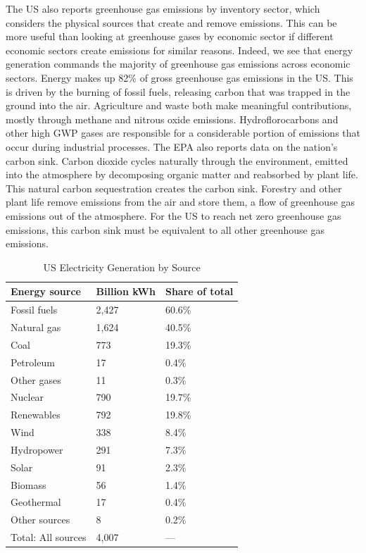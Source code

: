 The US also reports greenhouse gas emissions by inventory sector, which considers the physical sources that create and remove emissions. This can be more useful than looking at  greenhouse gases by economic sector if different economic sectors create emissions for similar reasons. Indeed, we see that energy generation commands the majority of greenhouse gas emissions across economic sectors. Energy makes up 82\% of gross greenhouse gas emissions in the US. This is driven by the burning of fossil fuels, releasing carbon that was trapped in the ground into the air. Agriculture and waste both make meaningful contributions, mostly through methane and nitrous oxide emissions. Hydroflorocarbons and other high GWP gases are responsible for a considerable portion of emissions that occur during industrial processes. The EPA also reports data on the nation's carbon sink. Carbon dioxide cycles naturally through the environment, emitted into the atmosphere by decomposing organic matter and reabsorbed by plant life. This natural carbon sequestration creates the carbon sink. Forestry and other plant life remove emissions from the air and store them, a flow of greenhouse gas emissions out of the atmosphere. For the US to reach net zero greenhouse gas emissions, this carbon sink must be equivalent to all other greenhouse gas emissions. 

\begin{table}
\caption{US Electricity Generation by Source \label{ele_gen_source}}
\centering
\begin{tabular}{l C{3cm} C{3cm}}
\hline \hline
Energy source & Billion kWh &	Share of total \\ 
\hline 
Fossil fuels & 2,427 & 60.6\% \\
\qquad Natural gas &	1,624	& 40.5\% \\
\qquad Coal & 773 & 19.3\%\\
\qquad Petroleum	& 17 & 0.4\% \\
\qquad Other gases & 11& 0.3\% \\
Nuclear & 790	& 19.7\% \\
Renewables & 792 & 19.8\% \\
\qquad Wind & 338 & 8.4\%\\
\qquad Hydropower	& 291 &	7.3\% \\
\qquad Solar & 91 & 2.3\% \\
\qquad Biomass	& 56 & 1.4\% \\
\qquad Geothermal & 17 & 0.4\% \\
Other sources & 8 & 0.2\% \\
Total: All sources	& 4,007  & ---\\
\hline \hline
\end{tabular}
\vspace{0.5em}
\end{table}

